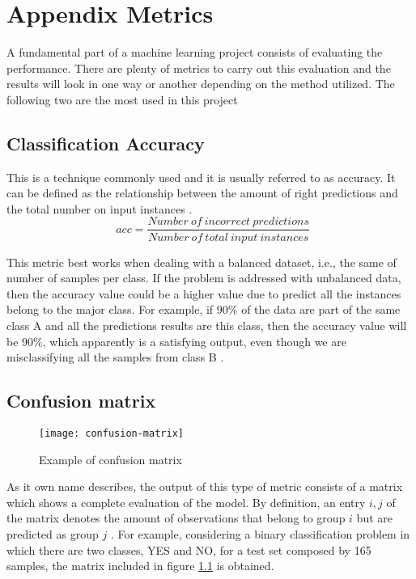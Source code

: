 

\chapter{Appendix Metrics}
\label{appendix:metrics}

	A fundamental part of a machine learning project consists of evaluating the performance. There are plenty of metrics to carry out this evaluation and the results will look in one way or another depending on the method utilized. The following two are the most used in this project
	
\section*{Classification Accuracy}

	This is a technique commonly used and it is usually referred to as accuracy. It can be defined as the relationship between the amount of right predictions and the total number on input instances \cite{Scikit-learn}.
	\[
	\ \ acc = \frac{Number\ of\ incorrect\  predictions}{Number\ of\ total\ input\ instances}
	\]
	
	This metric best works when dealing with a balanced dataset, i.e., the same of number of samples per class.
	If the problem is addressed with unbalanced data, then the accuracy value could be a higher value due to predict all the instances belong to the major class. For example, if $90\%$ of the data are part of the same class A and all the predictions results are this class, then the accuracy value will be $90\%$, which apparently is a satisfying output, even though we are misclassifying all the samples from class B \cite{Mishra2018}. 
	
\section*{Confusion matrix}

	\begin{figure}[b]
		\centering
		\captionsetup{justification=centering}
		\texttt{[image: confusion-matrix]}
		\caption{Example of confusion matrix}
		\label{fig:mesh6}
	\end{figure}

	As it own name describes, the output of this type of metric consists of a matrix which shows a complete evaluation of the model. By definition, an entry $i,j$ of the matrix denotes the amount of observations that belong to group $i$ but are predicted as group $j$ \cite{Scikit-learn}. For example, considering a binary classification problem in which there are two classes, YES and NO, for a test set composed by 165 samples, the matrix included in figure \ref{fig:mesh6} is obtained. 
	
